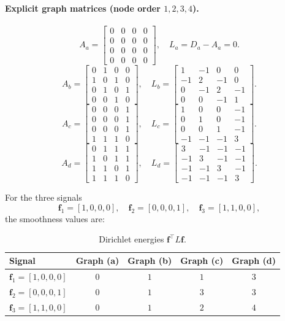 \documentclass[11pt]{article}
\begin{document}
\paragraph{Explicit graph matrices (node order \(1,2,3,4\)).}
\[
A_a=\begin{bmatrix}
0&0&0&0\\
0&0&0&0\\
0&0&0&0\\
0&0&0&0
\end{bmatrix},\quad
L_a=D_a-A_a=0.
\]
\[
A_b=\begin{bmatrix}
0&1&0&0\\
1&0&1&0\\
0&1&0&1\\
0&0&1&0
\end{bmatrix},\quad
L_b=\begin{bmatrix}
1&-1&0&0\\
-1&2&-1&0\\
0&-1&2&-1\\
0&0&-1&1
\end{bmatrix}.
\]
\[
A_c=\begin{bmatrix}
0&0&0&1\\
0&0&0&1\\
0&0&0&1\\
1&1&1&0
\end{bmatrix},\quad
L_c=\begin{bmatrix}
1&0&0&-1\\
0&1&0&-1\\
0&0&1&-1\\
-1&-1&-1&3
\end{bmatrix}.
\]
\[
A_d=\begin{bmatrix}
0&1&1&1\\
1&0&1&1\\
1&1&0&1\\
1&1&1&0
\end{bmatrix},\quad
L_d=\begin{bmatrix}
3&-1&-1&-1\\
-1&3&-1&-1\\
-1&-1&3&-1\\
-1&-1&-1&3
\end{bmatrix}.
\]

For the three signals
\[
\mathbf{f}_1=[1,0,0,0],\quad
\mathbf{f}_2=[0,0,0,1],\quad
\mathbf{f}_3=[1,1,0,0],
\]
the smoothness values are:

\begin{table}[htbp]
\centering
\begin{tabular}{lcccc}
\toprule
Signal & Graph (a) & Graph (b) & Graph (c) & Graph (d) \\
\midrule
$\mathbf{f}_1=[1,0,0,0]$ & $0$ & $1$ & $1$ & $3$ \\
$\mathbf{f}_2=[0,0,0,1]$ & $0$ & $1$ & $3$ & $3$ \\
$\mathbf{f}_3=[1,1,0,0]$ & $0$ & $1$ & $2$ & $4$ \\
\bottomrule
\end{tabular}
\caption{Dirichlet energies $\mathbf{f}^{\top}L\mathbf{f}$.}
\end{table}
\end{document}
